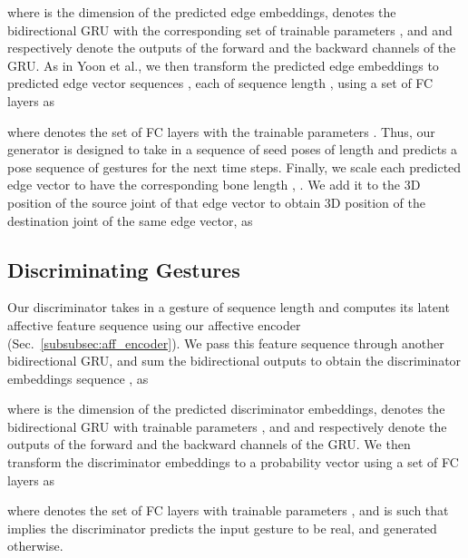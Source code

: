 \documentclass[conference,compsoc]{IEEEtran}
\theoremstyle{definition}
\begin{document}
where  is the dimension of the predicted edge embeddings,  denotes the bidirectional GRU with the corresponding set of trainable parameters , and  and  respectively denote the outputs of the forward and the backward channels of the GRU. As in Yoon et al., we then transform the predicted edge embeddings to predicted edge vector sequences , each of sequence length , using a set of FC layers as

where  denotes the set of FC layers with the trainable parameters . Thus, our generator is designed to take in a sequence of seed poses of length  and predicts a pose sequence of gestures for the next  time steps. Finally, we scale each predicted edge vector  to have the corresponding bone length , . We add it to the 3D position  of the source joint  of that edge vector to obtain 3D position  of the destination joint  of the same edge vector, as


\subsection{Discriminating Gestures}\label{subsec:discriminator}
Our discriminator takes in a gesture of sequence length  and computes its latent affective feature sequence  using our affective encoder (Sec.~\ref{subsubsec:aff_encoder}). We pass this feature sequence through another bidirectional GRU, and sum the bidirectional outputs to obtain the discriminator embeddings sequence , as

where  is the dimension of the predicted discriminator embeddings,  denotes the bidirectional GRU with trainable parameters , and  and  respectively denote the outputs of the forward and the backward channels of the GRU. We then transform the discriminator embeddings to a probability vector  using a set of FC layers as

where  denotes the set of FC layers with trainable parameters , and  is such that  implies the discriminator predicts the input gesture to be real, and generated otherwise.
\end{document}
